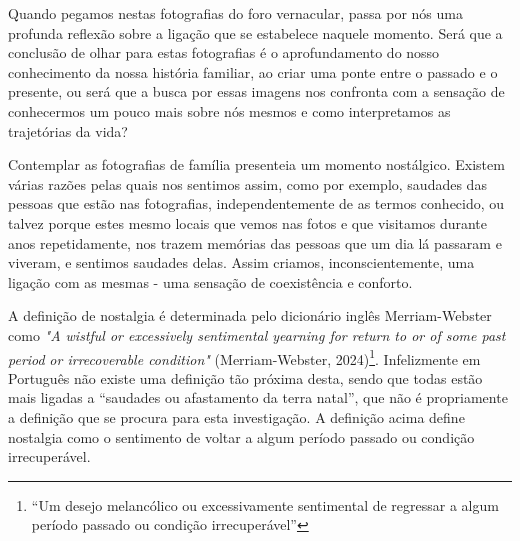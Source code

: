 \documentclass{article}
\begin{document}
Quando  pegamos  nestas  fotografias  do  foro  vernacular,  passa  por  nós  uma 
profunda  reflexão  sobre  a  ligação  que  se  estabelece  naquele  momento.  Será  que  a 
conclusão de olhar para estas fotografias é o aprofundamento do nosso conhecimento da 
nossa história familiar, ao criar uma ponte entre o passado e o presente, ou será que a 
busca por essas imagens nos confronta com a sensação de conhecermos um pouco mais 
sobre nós mesmos e como interpretamos as trajetórias da vida? 
 
Contemplar as fotografias de família presenteia um momento nostálgico. Existem 
várias razões pelas quais nos sentimos assim, como por exemplo, saudades das pessoas 
que estão nas fotografias, independentemente de as termos conhecido, ou talvez porque 
estes mesmo locais que vemos nas fotos e que visitamos durante anos repetidamente, nos 
trazem memórias das pessoas que um dia lá passaram e viveram, e sentimos saudades 
delas. Assim criamos, inconscientemente, uma ligação com as mesmas - uma sensação 
de coexistência e conforto.  
 

 



A definição de nostalgia é determinada pelo dicionário inglês Merriam-Webster 
como \textit{"A wistful or excessively sentimental yearning for return to or of some past period }
\textit{or irrecoverable condition"} (Merriam-Webster, 2024)\footnote{“Um desejo melancólico ou excessivamente sentimental de regressar a algum período passado ou condição irrecuperável” }. Infelizmente em Português não 
existe uma definição tão próxima desta, sendo que todas estão mais ligadas a “saudades 
ou afastamento da terra natal”, que não é propriamente a definição que se procura para 
esta  investigação.  A  definição  acima  define  nostalgia  como  o  sentimento  de  voltar  a 
algum período passado ou condição irrecuperável.  
 
\end{document}
